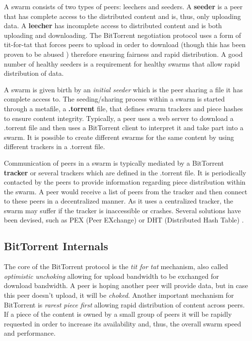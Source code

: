 A swarm consists of two types of peers: leechers and seeders. A
\textbf{seeder} is a peer that has complete access to the distributed content
and is, thus, only uploading data. A \textbf{leecher} has incomplete access to
distributed content and is both uploading and downloading. The BitTorrent
negotiation protocol uses a form of tit-for-tat that forces peers to upload in
order to download (though this has been proven to be abused
\cite{free-riding}) therefore ensuring fairness and rapid distribution. A good
number of healthy seeders is a requirement for healthy swarms that allow rapid
distribution of data.

A swarm is given birth by an \textit{initial seeder} which is the peer sharing
a file it has complete access to. The seeding/sharing process within a swarm
is started through a metafile, a \textbf{.torrent} file, that defines swarm
trackers and piece hashes to ensure content integrity. Typically, a peer uses
a web server to download a .torrent file and then uses a BitTorrent client to
interpret it and take part into a swarm. It is possible to create different
swarms for the same content by using different trackers in a .torrent file.

Communication of peers in a swarm is typically mediated by a BitTorrent
\textbf{tracker} or several trackers which are defined in the .torrent file.
It is periodically contacted by the peers to provide information regarding
piece distribution within the swarm. A peer would receive a list of peers from
the tracker and then connect to these peers in a decentralized manner. As it
uses a centralized tracker, the swarm may suffer if the tracker is
inaccessible or crashes. Several solutions have been devised, such as PEX
(Peer EXchange) \cite{pex} or DHT (Distributed Hash Table) \cite{dht-paper}.


\subsection{BitTorrent Internals}

The core of the BitTorrent protocol is the \textit{tit for tat} mechanism,
also called \textit{optimistic unchoking} allowing for upload bandwidth to be
exchanged for download bandwidth. A peer is hoping another peer will provide
data, but in case this peer doesn't upload, it will be \textit{choked}.
Another important mechanism for BitTorrent is \textit{rarest piece first}
allowing rapid distribution of content across peers. If a piece of the content
is owned by a small group of peers it will be rapidly requested in order to
increase its availability and, thus, the overall swarm speed and performance.

